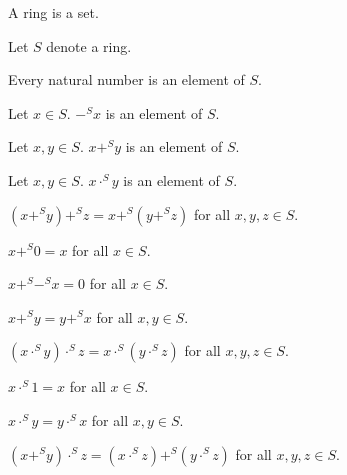 \documentclass{article}
\begin{document}
\begin{forthel}
  \begin{signature}
    A ring is a set.
  \end{signature}

  Let $S$ denote a ring.

  \begin{axiom}
    Every natural number is an element of $S$.
  \end{axiom}

  \begin{signature}
    Let $x \in S$.
    $-^{S} x$ is an element of $S$.
  \end{signature}

  \begin{signature}
    Let $x,y \in S$.
    $x +^{S} y$ is an element of $S$.
  \end{signature}

  \begin{signature}
    Let $x,y \in S$.
    $x \cdot^{S} y$ is an element of $S$.
  \end{signature}

  \begin{axiom}
    $(x +^{S} y) +^{S} z = x +^{S} (y +^{S} z)$ for all $x,y,z \in S$.
  \end{axiom}

  \begin{axiom}
    $x +^{S} 0 = x$ for all $x \in S$.
  \end{axiom}

  \begin{axiom}
    $x +^{S} -^{S} x = 0$ for all $x \in S$.
  \end{axiom}

  \begin{axiom}
    $x +^{S} y = y +^{S} x$ for all $x,y \in S$.
  \end{axiom}

  \begin{axiom}
    $(x \cdot^{S} y) \cdot^{S} z = x \cdot^{S} (y \cdot^{S} z)$ for all $x,y,z \in S$.
  \end{axiom}

  \begin{axiom}
    $x \cdot^{S} 1 = x$ for all $x \in S$.
  \end{axiom}

  \begin{axiom}
    $x \cdot^{S} y = y \cdot^{S} x$ for all $x,y \in S$.
  \end{axiom}

  \begin{axiom}
    $(x +^{S} y) \cdot^{S} z = (x \cdot^{S} z) +^{S} (y \cdot^{S} z)$ for all $x,y,z \in S$.
  \end{axiom}
\end{forthel}
\end{document}
